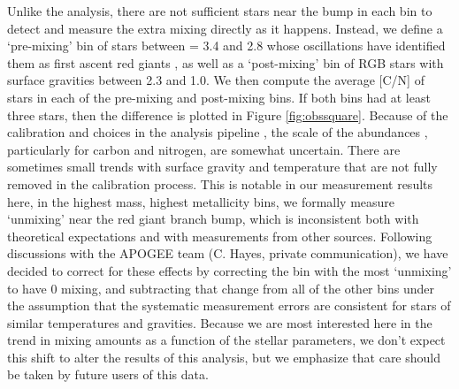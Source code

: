 Unlike the \citet{Shetrone2019} analysis, there are not sufficient stars near the bump in each bin to detect and measure the extra mixing directly as it happens. Instead, we define a `pre-mixing' bin of stars between \logg = 3.4 and 2.8 whose oscillations have identified them as first ascent red giants \citep{Elsworth2019}, as well as a `post-mixing' bin of RGB stars with surface gravities between 2.3 and 1.0. We then compute the average [C/N] of stars in each of the pre-mixing and post-mixing bins. If both bins had at least three stars, then the difference is plotted in Figure \ref{fig:obssquare}. Because of the calibration and choices in the analysis pipeline
\citep[see e.g.][]{Holtzman2018,Jonsson2020, vsmith_apogee_dr16_2021}, the scale of the abundances%
, particularly for carbon and nitrogen,
are somewhat uncertain.
There are sometimes small trends with surface gravity and temperature that are not fully removed in the calibration process. This is notable in our measurement results here, in the highest mass, highest metallicity bins, we formally measure `unmixing' near the red giant branch bump, which is inconsistent both with theoretical expectations and with measurements from other sources. Following discussions with the APOGEE team (C. Hayes, private communication), we have decided to correct for these effects by correcting the bin with the most `unmixing' to have 0 mixing, and subtracting that change from all of the other bins under the assumption that the systematic measurement errors are consistent for stars of similar temperatures and gravities. Because we are most interested here in the trend in mixing amounts as a function of the stellar parameters, we don't expect this shift to alter the results of this analysis, but we emphasize that care should be taken by future users of this data. 


